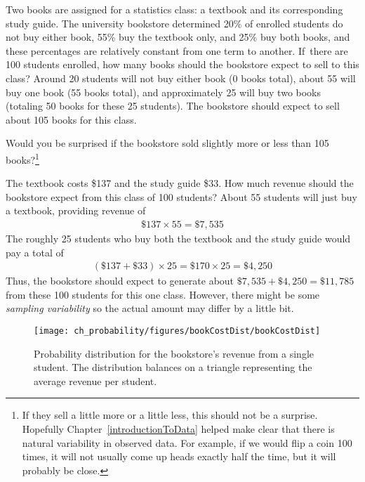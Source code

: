 
\begin{example}{Two books are assigned for a statistics class: a textbook and its corresponding study guide. The university bookstore determined 20\% of enrolled students do not buy either book, 55\% buy the textbook only, and 25\% buy both books, and these percentages are relatively constant from one term to another. If~there are 100 students enrolled, how many books should the bookstore expect to sell to this class?}\label{bookStoreSales}
Around 20 students will not buy either book (0 books total), about 55 will buy one book (55 books total), and approximately 25 will buy two books (totaling 50 books for these 25 students). The bookstore should expect to sell about 105 books for this class.
\end{example}

\begin{exercise}
Would you be surprised if the bookstore sold slightly more or less than 105 books?\footnote{If they sell a little more or a little less, this should not be a surprise. Hopefully Chapter~\ref{introductionToData} helped make clear that there is natural variability in observed data. For example, if we would flip a coin 100 times, it will not usually come up heads exactly half the time, but it will probably be close.}
\end{exercise}

\begin{example}{The textbook costs \$137 and the study guide \$33. How much revenue should the bookstore expect from this class of 100 students?}\label{bookStoreRev}
About 55 students will just buy a textbook, providing revenue of
\begin{eqnarray*}
\$137 \times  55 = \$7,535
\end{eqnarray*}
The roughly 25 students who buy both the textbook and the study guide would pay a total of
\begin{eqnarray*}
(\$137 + \$33) \times  25 = \$170 \times  25 = \$4,250
\end{eqnarray*}
Thus, the bookstore should expect to generate about $\$7,535 + \$4,250 = \$11,785$ from these 100 students for this one class. However, there might be some \emph{sampling variability} so the actual amount may differ by a little bit.
\end{example}

\begin{figure}[h]
\centering
\texttt{[image: ch\_probability/figures/bookCostDist/bookCostDist]}
\caption{Probability distribution for the bookstore's revenue from a single student. The distribution balances on a triangle representing the average revenue per student.}
\label{bookCostDist}
\end{figure}

